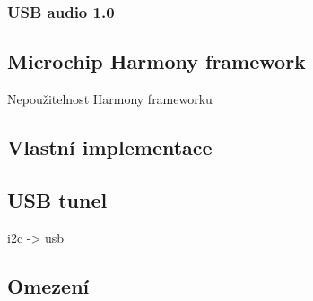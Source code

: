 
\subsubsection{USB audio 1.0}


\subsection{Microchip Harmony framework}
Nepoužitelnost Harmony frameworku\\

\subsection{Vlastní implementace}

\subsection{USB \iic tunel}
i2c -> usb\\


\subsection{Omezení}

